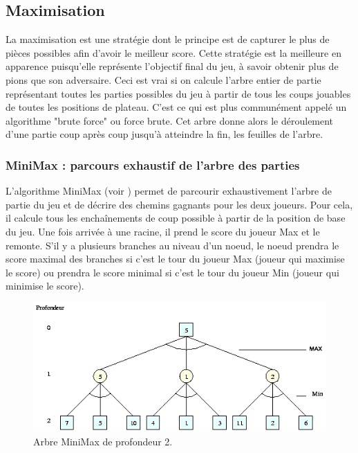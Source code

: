 \documentclass[a4paper,12pt]{report}
\begin{document}
\subsection{Maximisation}

La maximisation est une stratégie dont le principe est de capturer le plus de pièces possibles afin d’avoir le meilleur score. Cette stratégie est la meilleure en apparence puisqu’elle représente l'objectif final du jeu, à savoir obtenir plus de pions que son adversaire. Ceci est vrai si on calcule l’arbre entier de partie représentant toutes les parties possibles du jeu à partir de tous les coups jouables de toutes les positions de plateau. C'est ce qui est plus communément appelé un algorithme "brute force" ou force brute. Cet arbre donne alors le déroulement d'une partie coup après coup jusqu'à atteindre la fin, les feuilles de l'arbre.


\subsubsection{MiniMax : parcours exhaustif de l'arbre des parties}

L'algorithme MiniMax (voir \cite{1}) permet de parcourir exhaustivement l'arbre de partie du jeu et de décrire des chemins gagnants pour les deux joueurs. 
Pour cela, il calcule tous les enchaînements de coup possible à partir de la position de base du jeu. Une fois arrivée à une racine, il prend le score du joueur Max et le remonte. S'il y a plusieurs branches au niveau d'un noeud, le noeud prendra le score maximal des branches si c'est le tour du joueur Max (joueur qui maximise le score) ou prendra le score minimal si c'est le tour du joueur Min (joueur qui minimise le score).

\begin{figure}[H]
\centering
\includegraphics[scale=0.8]{Images/minimax.png}
\caption{Arbre MiniMax de profondeur 2.}
\label{minima}
\end{figure}
\end{document}
